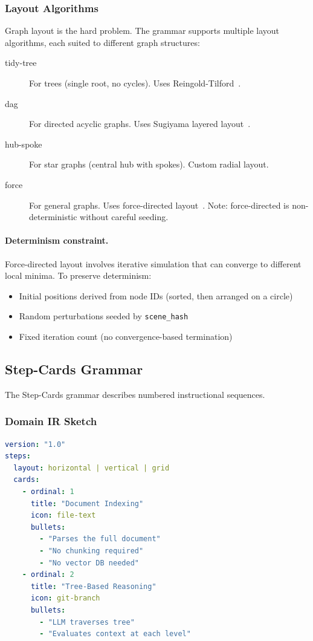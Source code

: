 \subsubsection{Layout Algorithms}

Graph layout is the hard problem. The grammar supports multiple layout algorithms, each suited to different graph structures:

\begin{description}
  \item[tidy-tree] For trees (single root, no cycles). Uses Reingold-Tilford~\cite{reingold1981}.
  \item[dag] For directed acyclic graphs. Uses Sugiyama layered layout~\cite{sugiyama1981}.
  \item[hub-spoke] For star graphs (central hub with spokes). Custom radial layout.
  \item[force] For general graphs. Uses force-directed layout~\cite{fruchterman1991}. Note: force-directed is non-deterministic without careful seeding.
\end{description}

\paragraph{Determinism constraint.}
Force-directed layout involves iterative simulation that can converge to different local minima. To preserve determinism:
\begin{itemize}
  \item Initial positions derived from node IDs (sorted, then arranged on a circle)
  \item Random perturbations seeded by \texttt{scene\_hash}
  \item Fixed iteration count (no convergence-based termination)
\end{itemize}

\subsection{Step-Cards Grammar}
\label{sec:stepcards-grammar}

The Step-Cards grammar describes numbered instructional sequences.

\subsubsection{Domain IR Sketch}

\begin{lstlisting}[language=yaml,caption={Step-Cards Domain IR (sketch)}]
version: "1.0"
steps:
  layout: horizontal | vertical | grid
  cards:
    - ordinal: 1
      title: "Document Indexing"
      icon: file-text
      bullets:
        - "Parses the full document"
        - "No chunking required"
        - "No vector DB needed"
    - ordinal: 2
      title: "Tree-Based Reasoning"
      icon: git-branch
      bullets:
        - "LLM traverses tree"
        - "Evaluates context at each level"
\end{lstlisting}

